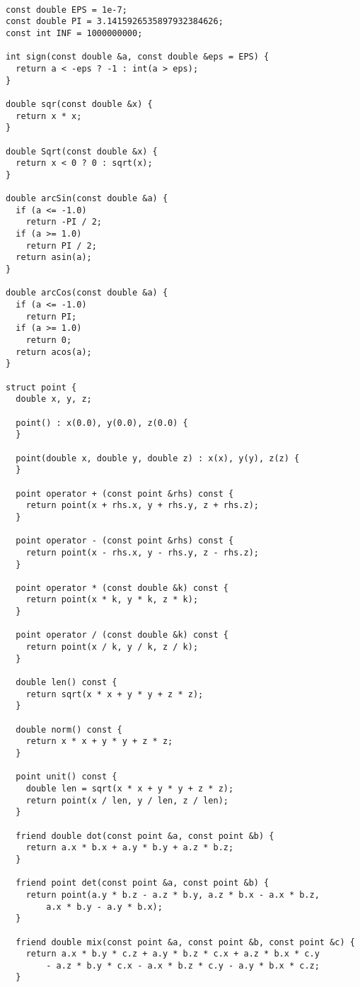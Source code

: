 \begin{lstlisting}

const double EPS = 1e-7;
const double PI = 3.1415926535897932384626;
const int INF = 1000000000;

int sign(const double &a, const double &eps = EPS) {
  return a < -eps ? -1 : int(a > eps);
}

double sqr(const double &x) {
  return x * x;
}

double Sqrt(const double &x) {
  return x < 0 ? 0 : sqrt(x);
}

double arcSin(const double &a) {
  if (a <= -1.0)
    return -PI / 2;
  if (a >= 1.0)
    return PI / 2;
  return asin(a);
}

double arcCos(const double &a) {
  if (a <= -1.0)
    return PI;
  if (a >= 1.0)
    return 0;
  return acos(a);
}

struct point {
  double x, y, z;

  point() : x(0.0), y(0.0), z(0.0) {
  }

  point(double x, double y, double z) : x(x), y(y), z(z) {
  }

  point operator + (const point &rhs) const {
    return point(x + rhs.x, y + rhs.y, z + rhs.z);
  }

  point operator - (const point &rhs) const {
    return point(x - rhs.x, y - rhs.y, z - rhs.z);
  }

  point operator * (const double &k) const {
    return point(x * k, y * k, z * k);
  }

  point operator / (const double &k) const {
    return point(x / k, y / k, z / k);
  }

  double len() const {
    return sqrt(x * x + y * y + z * z);
  }

  double norm() const {
    return x * x + y * y + z * z;
  }

  point unit() const {
    double len = sqrt(x * x + y * y + z * z);
    return point(x / len, y / len, z / len);
  }

  friend double dot(const point &a, const point &b) {
    return a.x * b.x + a.y * b.y + a.z * b.z;
  }

  friend point det(const point &a, const point &b) {
    return point(a.y * b.z - a.z * b.y, a.z * b.x - a.x * b.z,
        a.x * b.y - a.y * b.x);
  }

  friend double mix(const point &a, const point &b, const point &c) {
    return a.x * b.y * c.z + a.y * b.z * c.x + a.z * b.x * c.y
        - a.z * b.y * c.x - a.x * b.z * c.y - a.y * b.x * c.z;
  }


\end{lstlisting}
